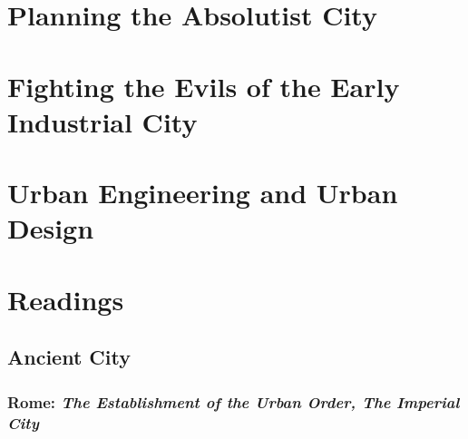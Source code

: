 \documentclass{article}
\begin{document}
\section{Planning the Absolutist City}



\subsection{}

\section{Fighting the Evils of the Early Industrial City}




\section{Urban Engineering and Urban Design}




\section{Readings}

\subsection{Ancient City}

\subsubsection{Rome: \textit{The Establishment of the Urban Order, The Imperial City} \parencite{hall1998cities}}
\end{document}
